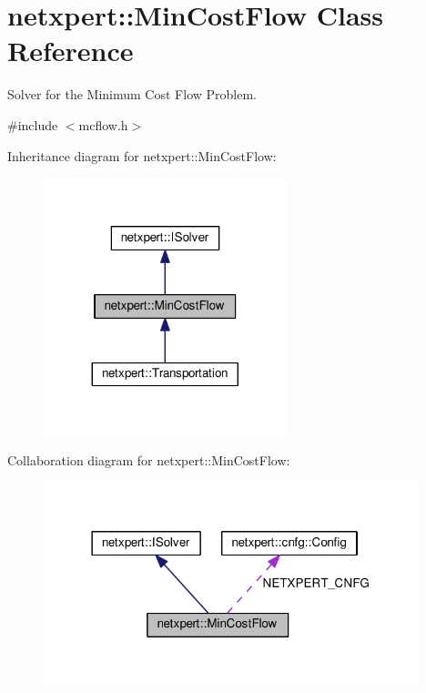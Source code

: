 \hypertarget{classnetxpert_1_1MinCostFlow}{}\section{netxpert\+:\+:Min\+Cost\+Flow Class Reference}
\label{classnetxpert_1_1MinCostFlow}


Solver for the Minimum Cost Flow Problem.  




{\ttfamily \#include $<$mcflow.\+h$>$}



Inheritance diagram for netxpert\+:\+:Min\+Cost\+Flow\+:\nopagebreak
\begin{figure}[H]
\begin{center}
\leavevmode
\includegraphics[width=200pt]{classnetxpert_1_1MinCostFlow__inherit__graph}
\end{center}
\end{figure}


Collaboration diagram for netxpert\+:\+:Min\+Cost\+Flow\+:\nopagebreak
\begin{figure}[H]
\begin{center}
\leavevmode
\includegraphics[width=309pt]{classnetxpert_1_1MinCostFlow__coll__graph}
\end{center}
\end{figure}
